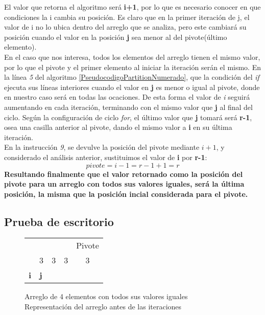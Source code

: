     El valor que retorna el algoritmo será \textbf{i+1}, por lo que es necesario conocer en que condiciones la i cambia su posición. Es claro que en la primer iteración de j, el valor de i no lo ubica dentro del arreglo que se analiza, pero este cambiará su posición cuando el valor en la posición \textbf{j} sea menor al del pivote(último elemento).\\
    
    En el caso que nos interesa, todos los elementos del arreglo tienen el mismo valor, por lo que el pivote y el primer elemento al iniciar la iteración serán el mismo. En la línea \textit{5} del algoritmo \ref{PseudocodigoPartitionNumerado}, que la condición del \textit{if} ejecuta sus líneas interiores cuando el valor en \textbf{j} es menor o igual al pivote, donde en nuestro caso será en todas las ocaciones. De esta forma el valor de \textit{i} seguirá aumentando en cada iteración, terminando con el mismo valor que \textbf{j} al final del ciclo. Según la configuración de ciclo \textit{for}, el último valor que \textbf{j} tomará será \textbf{r-1}, osea una casilla anterior al pivote, dando el mismo valor a \textbf{i} en su última iteración.\\
    
    En la instrucción \textit{9}, se devulve la posición del pivote mediante $i+1$, y considerado el análisis anterior, sustituimos el valor de \textbf{i} por \textbf{r-1}:
    $$pivote = i-1 = r-1+1 = r$$
    \textbf{Resultando finalmente que el valor retornado como la posición del pivote para un arreglo con todos sus valores iguales, será la última posición, la misma que la posición incial considerada para el pivote.}
    
    \subsection*{Prueba de escritorio}
    \begin{figure}[h!]
        \centering
        \begin{tabular}{p{1cm}p{1cm}p{1cm}p{1cm}p{1cm}}
            & & & & {\small Pivote} \\\cline{2-5}
            & \multicolumn{1}{|c|}{3} & \multicolumn{1}{c|}{3} & \multicolumn{1}{c|}{3} & \multicolumn{1}{c|}{3} \\ \cline{2-5}
            \textbf{i} & \textbf{j} & & & \\
        \end{tabular}
        \caption{Arreglo de 4 elementos con todos sus valores iguales\\Representación del arreglo antes de las iteraciones}
        \label{fig:my_label}
    \end{figure}
    
